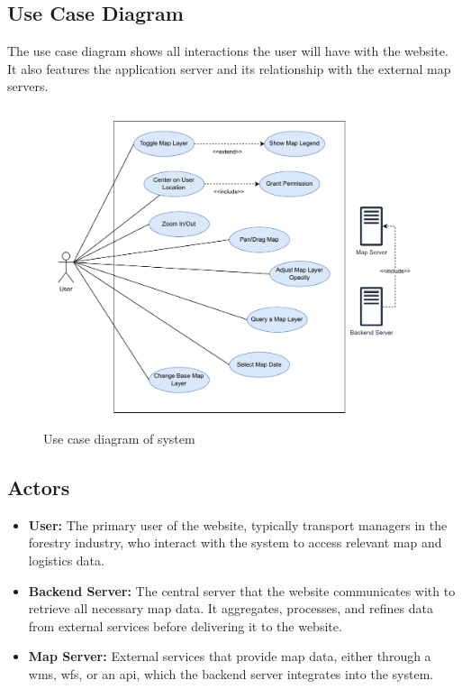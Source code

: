 \subsection{Use Case Diagram}
The use case diagram shows all interactions the user will have with the website. It also features the application server and its relationship with the external map servers.
\begin{figure}[h]
    \centering
    \includegraphics[width=1\linewidth]{figures/use_case_diagram.pdf}
    \caption{Use case diagram of system}
    \label{fig:use_case_diagram}
\end{figure}

\subsection{Actors}
\begin{itemize}
    \item \textbf{User:} The primary user of the website, typically transport managers in the forestry industry, who interact with the system to access relevant map and logistics data.
    \item \textbf{Backend Server:} The central server that the website communicates with to retrieve all necessary map data. It aggregates, processes, and refines data from external services before delivering it to the website.
    \item \textbf{Map Server:} External services that provide map data, either through a \Gls{wms}, \Gls{wfs}, or an \acrshort{api}, which the backend server integrates into the system.
\end{itemize}


